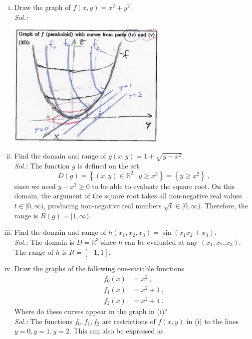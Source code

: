 \begin{example}
\label{expl:first_graphs}
\begin{enumerate}[(i)]
\item Draw the graph of $f(x,y) = x^2 + y^2$.\\
{\it Sol.:}
\begin{center}
	\includegraphics[width=0.6\textwidth]{./Figures/f301.png}
\end{center}
\item Find the domain and range of $g(x,y)= 1 + \sqrt{y-x^2}$.\\
{\it Sol.:}
The function $g$ is defined on the set
\[ D(g) = \left\{ (x,y) \in \mathbb{R}^2 \: | \: y \ge x^2 \right\} = \left\{ y \ge x^2 \right\} \:, \]
since we need $ y-x^2 \ge 0$ to be able to evaluate the square root. On this domain, the argument of the square root takes all non-negative real values $t\in[0,\infty)$, producing non-negative real numbers $\sqrt{t}\in[0,\infty)$. Therefore, the range is $R(g) = [1, \infty).$
\item Find the domain and range of $h(x_1,x_2,x_3)= \sin (x_1x_2+x_3)$.\\
{\it Sol.:}
The domain is $D = \mathbb{R}^3$ since $h$ can be evaluated at any $(x_1,x_2,x_3)$. The range of $h$ is $R = [-1,1]$.
\item Draw the graphs of the following one-variable functions
\begin{equation*}
\begin{split}
f_0(x) & = x^2 \:, \\
f_1(x) & = x^2 + 1 \:, \\
f_2(x) & = x^2 + 4 \:.
\end{split}
\end{equation*}
Where do these curves appear in the graph in (i)?\\
{\it Sol.:}
The functions $f_0,f_1,f_2$ are restrictions of $f(x,y)$ in (i) to the lines $y=0,y=1,y=2$. This can also be expressed as

\end{enumerate}
\end{example}
